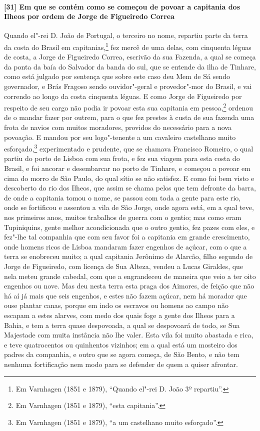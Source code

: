 \begin{linenumbers}
\paragraph{[31] Em que se contém como se começou de povoar a capitania dos Ilheos por ordem
de Jorge de Figueiredo Correa} \quad
Quando el"-rei D. João de Portugal, o terceiro no nome, repartiu parte da terra da costa do
Brasil em capitanias,\footnote{ Em Varnhagen (1851 e 1879), ``Quando el"-rei D. João 3º
repartiu''.} fez mercê de uma delas, com cinquenta léguas de costa, a Jorge de Figueiredo
Correa, escrivão da sua Fazenda, a qual se começa da ponta da baía do Salvador da banda do
sul, que se entende da ilha de Tinhare, como está julgado por sentença que sobre este caso
deu Mem de Sá sendo governador, e Brás Fragoso sendo ouvidor"-geral e provedor"-mor do
Brasil, e vai correndo ao longo da costa cinquenta léguas. E como Jorge de Figueiredo por
respeito de seu cargo não podia ir povoar esta sua capitania em pessoa,\footnote{ Em
Varnhagen (1851 e 1879), ``esta capitania''.} ordenou de o mandar fazer por outrem, para o
que fez prestes à custa de sua fazenda uma frota de navios com muitos moradores, providos
do necessário para a nova povoação. E mandou por seu logo"-tenente a um cavaleiro
castelhano muito esforçado,\footnote{ Em Varnhagen (1851 e 1879), ``a um castelhano muito
esforçado''.} experimentado e prudente, que se chamava Francisco Romeiro, o qual partiu do
porto de Lisboa com sua frota, e fez sua viagem para esta costa do Brasil, e foi ancorar e
desembarcar no porto de Tinhare, e começou a povoar em cima do morro de São Paulo, do qual
sítio se não satisfez. E como foi bem visto e descoberto do rio dos Ilheos, que assim se
chama pelos que tem defronte da barra, de onde a capitania tomou o nome, se passou com
toda a gente para este rio, onde se fortificou e assentou a vila de São Jorge, onde agora
está, em a qual teve, nos primeiros anos, muitos trabalhos de guerra com o gentio; mas
como eram Tupiniquins, gente melhor acondicionada que o outro gentio, fez pazes com eles,
e fez"-lhe tal companhia que com seu favor foi a capitania em grande crescimento, onde
homens ricos de Lisboa mandaram fazer engenhos de açúcar, com o que a terra se enobreceu
muito; a qual capitania Jerônimo de Alarcão, filho segundo de Jorge de Figueiredo, com
licença de Sua Alteza, vendeu a Lucas Giraldes, que nela meteu grande cabedal, com que a
engrandeceu de maneira que veio a ter oito engenhos ou nove. Mas deu nesta terra esta
praga dos Aimores, de feição que não há aí já mais que seis engenhos, e estes não fazem
açúcar, nem há morador que ouse plantar canas, porque em indo os escravos ou homens ao
campo não escapam a estes alarves, com medo dos quais foge a gente dos Ilheos para a
Bahia, e tem a terra quase despovoada, a qual se despovoará de todo, se Sua Majestade com
muita instância não lhe valer. Esta vila foi muito abastada e rica, e teve quatrocentos ou
quinhentos vizinhos; em a qual está um mosteiro dos padres da companhia, e outro que se
agora começa, de São Bento, e não tem nenhuma fortificação nem modo para se defender de
quem a quiser afrontar.


\end{linenumbers}
